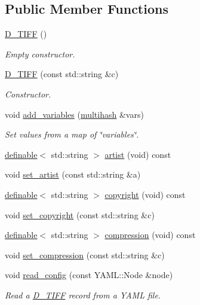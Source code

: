 \subsection*{Public Member Functions}
\begin{DoxyCompactItemize}
\item 
\hyperlink{class_photo_finish_1_1_d___t_i_f_f_adc4f367566d37ab98ee231914892293e}{D\+\_\+\+T\+I\+FF} ()
\begin{DoxyCompactList}\small\item\em Empty constructor. \end{DoxyCompactList}\item 
\hyperlink{class_photo_finish_1_1_d___t_i_f_f_a9e693e5c8fd373710a1d84f8c930f8b5}{D\+\_\+\+T\+I\+FF} (const std\+::string \&c)
\begin{DoxyCompactList}\small\item\em Constructor. \end{DoxyCompactList}\item 
void \hyperlink{class_photo_finish_1_1_d___t_i_f_f_af3532152cdad7861ec932185255d5756}{add\+\_\+variables} (\hyperlink{namespace_photo_finish_a6f41796f162687538b7da5c7a95e2d18}{multihash} \&vars)
\begin{DoxyCompactList}\small\item\em Set values from a map of \char`\"{}variables\char`\"{}. \end{DoxyCompactList}\item 
\hyperlink{class_photo_finish_1_1definable}{definable}$<$ std\+::string $>$ \hyperlink{class_photo_finish_1_1_d___t_i_f_f_a9b9d16bc60b26b183df0466b43d68856}{artist} (void) const
\item 
void \hyperlink{class_photo_finish_1_1_d___t_i_f_f_ade4bce8361e98e906ada41989a05b1e4}{set\+\_\+artist} (const std\+::string \&a)
\item 
\hyperlink{class_photo_finish_1_1definable}{definable}$<$ std\+::string $>$ \hyperlink{class_photo_finish_1_1_d___t_i_f_f_a2c7422a4d865d99ea182dd5348a996ce}{copyright} (void) const
\item 
void \hyperlink{class_photo_finish_1_1_d___t_i_f_f_ab614c8470f34adfcfb41810a323047ec}{set\+\_\+copyright} (const std\+::string \&c)
\item 
\hyperlink{class_photo_finish_1_1definable}{definable}$<$ std\+::string $>$ \hyperlink{class_photo_finish_1_1_d___t_i_f_f_afca18b8121e40e624bf8d488a3f743e2}{compression} (void) const
\item 
void \hyperlink{class_photo_finish_1_1_d___t_i_f_f_afae792bdbeb0014b921cf3334d88e798}{set\+\_\+compression} (const std\+::string \&c)
\item 
void \hyperlink{class_photo_finish_1_1_d___t_i_f_f_a3b6e555de8e82db02a5c791d8ffa519d}{read\+\_\+config} (const Y\+A\+M\+L\+::\+Node \&node)
\begin{DoxyCompactList}\small\item\em Read a \hyperlink{class_photo_finish_1_1_d___t_i_f_f}{D\+\_\+\+T\+I\+FF} record from a Y\+A\+ML file. \end{DoxyCompactList}\end{DoxyCompactItemize}
